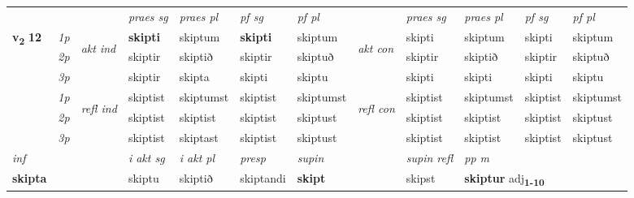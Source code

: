 \begin{longtable}[l]{X>{\footnotesize\itshape}llXXXXlXXXX}
 & &   & \textit{praes sg}  & \textit{praes pl}    & \textit{ pf sg} & \textit{pf pl} & & \textit{praes sg}  & \textit{praes pl}    & \textit{pf sg} & \textit{pf pl }  \\ \cmidrule{4-7} \cmidrule{9-12}
 \multirow{2}{*}{{{\textbf{v{\textsubscript{2}}} \Large{\textbf{12}}}}}  & 1p & \multirow{3}{*}{\begin{turn}{90}\textit{akt ind}\end{turn}} & \textbf{skipti} & skiptum & \textbf{skipti} & skiptum & \multirow{3}{*}{\begin{turn}{90}\textit{akt con}\end{turn}} &skipti & skiptum & skipti & skiptum\\*
 & 2p &  &  skiptir  & skiptið & skiptir & skiptuð & & skiptir & skiptið & skiptir & skiptuð \\*
 & 3p &  & skiptir & skipta & skipti & skiptu & & skipti & skipti& skipti & skiptu \\*
\cmidrule{4-7} \cmidrule{9-12}
 & 1p & \multirow{3}{*}{\begin{turn}{90}\textit{refl ind}\end{turn}}  & skiptist & skiptumst & skiptist & skiptumst & \multirow{3}{*}{\begin{turn}{90}\textit{refl con}\end{turn}}  &skiptist & skiptumst & skiptist & skiptumst \\*
 & 2p &  & skiptist & skiptist & skiptist & skiptust & &skiptist & skiptist & skiptist & skiptust \\*
 & 3p  & & skiptist & skiptast & skiptist & skiptust & & skiptist & skiptist& skiptist & skiptust \\*
\cmidrule{4-7} \cmidrule{9-12}

   {\textit{inf}} & &  & \textit{i akt sg} & \textit{i akt pl}   & \textit{presp} & \textit{supin} && \textit{supin refl} & \textit{pp m} \\*
  {\textbf{skipta}} & && skiptu  & skiptið   & skiptandi &  \textbf{skipt} && skipst & \multicolumn{2}{l}{\textbf{skiptur} adj\textbf{\textsubscript{1-10}}} \\*

\midrule


\end{longtable}
